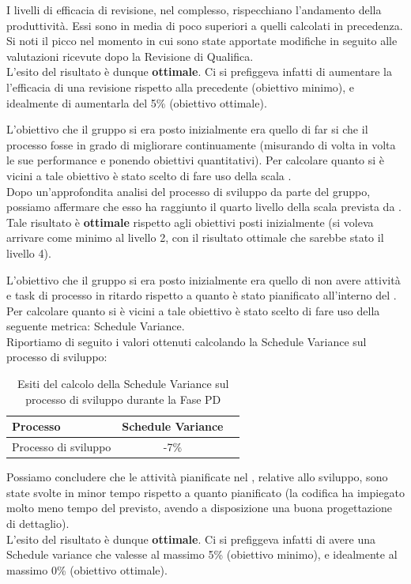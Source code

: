 				I livelli di efficacia di revisione, nel complesso, rispecchiano l'andamento della produttività. Essi sono in media di poco superiori a quelli calcolati in precedenza. Si noti il picco nel momento in cui sono state apportate modifiche in seguito alle valutazioni ricevute dopo la Revisione di Qualifica.\\
				L'esito del risultato è dunque \textbf{ottimale}. Ci si prefiggeva infatti di aumentare la l'efficacia di una revisione rispetto alla  precedente (obiettivo minimo), e idealmente di aumentarla del 5\% (obiettivo ottimale).

				L'obiettivo che il gruppo si era posto inizialmente era quello di far si che il processo fosse in grado di migliorare continuamente (misurando di volta in volta le sue performance e ponendo obiettivi quantitativi). Per calcolare quanto si è vicini a tale obiettivo è stato scelto di fare uso della scala .\\
				Dopo un'approfondita analisi del processo di sviluppo da parte del gruppo, possiamo affermare che esso ha raggiunto il quarto livello della scala prevista da .\\
				Tale risultato è \textbf{ottimale} rispetto agli obiettivi posti inizialmente (si voleva arrivare come minimo al livello 2, con il risultato ottimale che sarebbe stato il livello 4).
			
				L'obiettivo che il gruppo si era posto inizialmente era quello di non avere attività e task di processo in ritardo rispetto a quanto è stato pianificato all'interno del . Per calcolare quanto si è vicini a tale obiettivo è stato scelto di fare uso della seguente metrica: Schedule Variance.\\
				Riportiamo di seguito i valori ottenuti calcolando la Schedule Variance sul processo di sviluppo:
				\begin{table}[H]
					\centering
					\begin{tabu}{| l | c | c |}
						\hline
						Processo 			   & Schedule Variance   \\ \hline \hline
						Processo di sviluppo   & -7\%                \\ \hline
					\end{tabu}
					\caption{Esiti del calcolo della Schedule Variance sul processo di sviluppo durante la Fase PD}
				\end{table}
				Possiamo concludere che le attività pianificate nel , relative allo sviluppo, sono state svolte in minor tempo rispetto a quanto pianificato (la codifica ha impiegato molto meno tempo del previsto, avendo a disposizione una buona progettazione di dettaglio).\\
				L'esito del risultato è dunque \textbf{ottimale}. Ci si prefiggeva infatti di avere una Schedule variance che valesse al massimo 5\% (obiettivo minimo), e idealmente al massimo 0\% (obiettivo ottimale).
						
